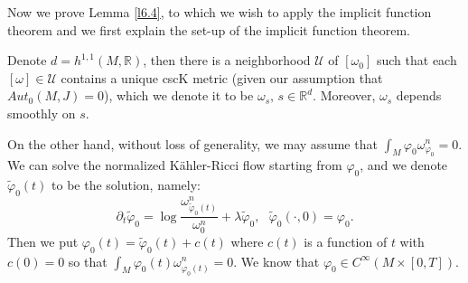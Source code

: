 \documentclass[11pt]{amsart}
\numberwithin{equation}{section}
\newcommand{\bR}{ \mathbb{R}} %
\begin{document}
Now we prove Lemma \ref{l6.4},  to which we wish to apply the implicit function theorem and we first explain the set-up of the implicit function theorem.

Denote $d=h^{1,1}(M,\bR)$,  then there is a neighborhood $\mathcal{U}$ of $[\omega_0]$ such that each $[\omega]\in \mathcal{U}$ contains a unique cscK metric (given our assumption that $Aut_0(M,J)=0$),  which we denote it to be $\omega_s,\,s\in \bR^d$.  Moreover,  $\omega_s$ depends smoothly on $s$.  

On the other hand,  without loss of generality,  we may assume that $\int_M\varphi_0\omega_{\varphi_0}^n=0$.  
We can solve the normalized K\"ahler-Ricci flow starting from $\varphi_0$,  and we denote $\tilde{\varphi}_0(t)$ to be the solution,  namely:
\begin{equation*}
\partial_t\tilde{\varphi}_0=\log\frac{\omega_{\tilde{\varphi}_0(t)}^n}{\omega_0^n}+\lambda\tilde{\varphi}_0,\,\,\,\,\tilde{\varphi}_0(\cdot,0)=\varphi_0.
\end{equation*}
Then we put $\varphi_0(t)=\tilde{\varphi}_0(t)+c(t)$ where $c(t)$ is a function of $t$ with $c(0)=0$ so that $\int_M\varphi_0(t)\omega_{\varphi_0(t)}^n=0$.  We know that $\varphi_0\in C^{\infty}(M\times [0,T])$.  
\end{document}
